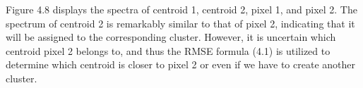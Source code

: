 \documentclass{article}
\begin{document}
{                    
                    Figure 4.8 displays the spectra of centroid 1, centroid 2, pixel 1, and pixel 2. The spectrum of centroid 2 is remarkably similar to that of pixel 2, indicating that it will be assigned to the corresponding cluster. However, it is uncertain which centroid pixel 2 belongs to, and thus the RMSE formula (4.1) is utilized to determine which centroid is closer to pixel 2 or even if we have to create another cluster.
                    \newpage
                    \vspace*{3\baselineskip}
                    
                    \begin{table}[h]
                      \centering
                      \caption{Centroids \& Pixel 1 values}
                      \vspace*{2\baselineskip}
                      \label{tab:result-table}
                      \renewcommand{\arraystretch}{2.5} %
\end{table}}
\end{document}
